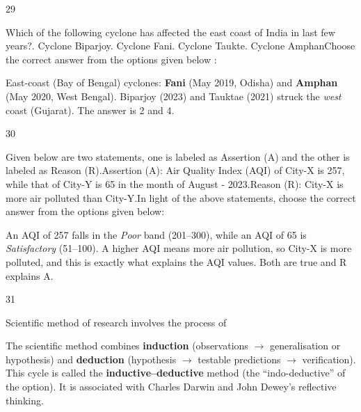 \begin{question}{29}
{Which of the following cyclone has affected the east coast of India in last few years?. Cyclone Biparjoy. Cyclone Fani. Cyclone Taukte. Cyclone Amphan\newline Choose the correct answer from the options given below :\par}
\begin{explain}
East-coast (Bay of Bengal) cyclones: \textbf{Fani} (May 2019, Odisha) and \textbf{Amphan} (May 2020, West Bengal).
Biparjoy (2023) and Tauktae (2021) struck the \emph{west} coast (Gujarat). The answer is 2 and 4.
\end{explain}
\end{question}

\begin{question}{30}
{Given below are two statements, one is labeled as Assertion (A) and the other is labeled as Reason (R).\newline Assertion (A): Air Quality Index (AQI) of City-X is 257, while that of City-Y is 65 in the month of August - 2023.\newline Reason (R): City-X is more air polluted than City-Y.\newline In light of the above statements, choose the correct answer from the options given below:\par}
\begin{explain}
An AQI of 257 falls in the \emph{Poor} band (201--300), while an AQI of 65 is \emph{Satisfactory} (51--100). A higher AQI means more air pollution, so City-X is more polluted, and this is exactly what explains the AQI values. Both are true and R explains A.
\end{explain}
\end{question}

\begin{question}{31}
{Scientific method of research involves the process of\par}
\begin{explain}
The scientific method combines \textbf{induction} (observations $\rightarrow$ generalisation or hypothesis) and \textbf{deduction} (hypothesis $\rightarrow$ testable predictions $\rightarrow$ verification). This cycle is called the \textbf{inductive--deductive} method (the ``indo-deductive'' of the option). It is associated with Charles Darwin and John Dewey's reflective thinking.
\end{explain}
\end{question}

